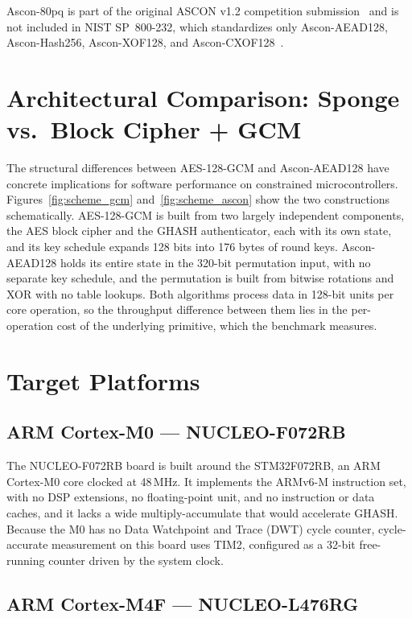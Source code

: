 Ascon-80pq is part of the original ASCON v1.2 competition
submission~\cite{ASCONSpec} and is not included in NIST SP~800-232, which
standardizes only Ascon-AEAD128, Ascon-Hash256, Ascon-XOF128, and
Ascon-CXOF128~\cite{NISTSP800232}.

\section{Architectural Comparison: Sponge vs.\ Block Cipher + GCM}

The structural differences between AES-128-GCM and Ascon-AEAD128 have concrete
implications for software performance on constrained microcontrollers.
Figures~\ref{fig:scheme_gcm} and~\ref{fig:scheme_ascon} show the two constructions schematically.
AES-128-GCM is built from two largely independent components, the AES block
cipher and the GHASH authenticator, each with its own state, and its key
schedule expands 128 bits into 176 bytes of round keys.
Ascon-AEAD128 holds its entire state in the 320-bit permutation input, with no
separate key schedule, and the permutation is built from bitwise rotations and
XOR with no table lookups.
Both algorithms process data in 128-bit units per core operation, so the
throughput difference between them lies in the per-operation cost of the
underlying primitive, which the benchmark measures.

\section{Target Platforms}

\subsection{ARM Cortex-M0 --- NUCLEO-F072RB}

The NUCLEO-F072RB board is built around the STM32F072RB, an ARM Cortex-M0 core
clocked at 48\,MHz.
It implements the ARMv6-M instruction set, with no DSP extensions, no
floating-point unit, and no instruction or data caches, and it lacks a wide
multiply-accumulate that would accelerate GHASH.
Because the M0 has no Data Watchpoint and Trace (DWT) cycle counter,
cycle-accurate measurement on this board uses TIM2, configured as a 32-bit
free-running counter driven by the system clock.

\subsection{ARM Cortex-M4F --- NUCLEO-L476RG}

